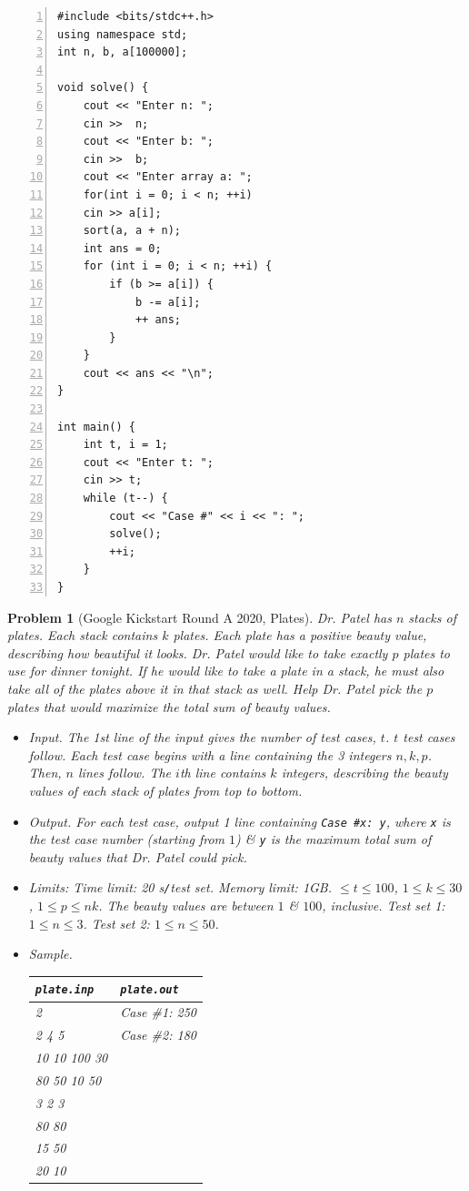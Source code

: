 \documentclass{article}
\newtheorem{problem}{Problem}
\begin{document}
\begin{Verbatim}[numbers=left,xleftmargin=5mm]
#include <bits/stdc++.h>
using namespace std;
int n, b, a[100000];

void solve() {
    cout << "Enter n: ";
    cin >>  n;
    cout << "Enter b: ";
    cin >>  b;
    cout << "Enter array a: ";
    for(int i = 0; i < n; ++i)
    cin >> a[i];
    sort(a, a + n);
    int ans = 0;
    for (int i = 0; i < n; ++i) {
        if (b >= a[i]) {
            b -= a[i];
            ++ ans;
        }
    }
    cout << ans << "\n";
}

int main() {
    int t, i = 1;
    cout << "Enter t: ";
    cin >> t;
    while (t--) {
        cout << "Case #" << i << ": ";
        solve();
        ++i;
    }
}
\end{Verbatim}

\begin{problem}[Google Kickstart Round A 2020, Plates]
	Dr. Patel has $n$ stacks of plates. Each stack contains $k$ plates. Each plate has a positive beauty value, describing how beautiful it looks. Dr. Patel would like to take exactly $p$ plates to use for dinner tonight. If he would like to take a plate in a stack, he must also take all of the plates above it in that stack as well. Help Dr. Patel pick the $p$ plates that would maximize the total sum of beauty values.
	\begin{itemize}
		\item {\sf Input.} The 1st line of the input gives the number of test cases, $t$. $t$ test cases follow. Each test case begins with a line containing the 3 integers $n,k,p$. Then, $n$ lines follow. The $i$th line contains $k$ integers, describing the beauty values of each stack of plates from top to bottom.
		\item {\sf Output.} For each test case, output 1 line containing \verb|Case #x: y|, where {\tt x} is the test case number (starting from $1$) \& {\tt y} is the maximum total sum of beauty values that Dr. Patel could pick.
		\item {\sf Limits:} Time limit: \emph{20 s{\tt /}test set}. Memory limit: \emph{1GB}. $\le t\le100$, $1\le k\le30$, $1\le p\le nk$. The beauty values are between $1$ \& $100$, inclusive. Test set 1: $1\le n\le 3$. Test set 2: $1\le n\le50$.
		\item {\sf Sample.}
		\begin{table}[H]
			\centering
			\begin{tabular}{|l|l|}
				\hline
				{\tt plate.inp} & {\tt plate.out} \\
				\hline
				2 & Case \#1: 250 \\
				2 4 5 & Case \#2: 180 \\
				10 10 100 30 & \\
				80 50 10 50 & \\
				3 2 3 & \\
				80 80 & \\
				15 50 & \\
				20 10 & \\
				\hline
			\end{tabular}
		\end{table}
	\end{itemize}
\end{problem}
\end{document}
